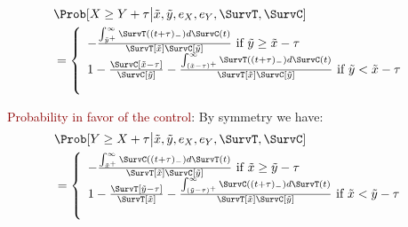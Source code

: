 \documentclass[12pt]{article}
\newcommand\xobs{\tilde{x}}
\newcommand\yobs{\tilde{y}}
\newcommand\censT{e_X}
\newcommand\censC{e_Y}
\begin{document}
\begin{align*}
&\Prob[X \geq Y + \tau \big| \xobs, \yobs, \censT, \censC, \SurvT, \SurvC] \\
&= \left\{ \begin{array}{ll}
           - \frac{
\int_{\yobs^+}^{\infty} \SurvT((t+\tau)_-) d \SurvC(t)
}{
\SurvT[\xobs]\SurvC[\yobs]
}  \text{ if } \yobs \geq \xobs - \tau\\
           1-\frac{\SurvC[\xobs - \tau]}{\SurvC[\yobs]} - \frac{
\int_{(\xobs-\tau)^+}^{\infty} \SurvT((t+\tau)_-) d \SurvC(t)
}{
\SurvT[\xobs]\SurvC[\yobs]
} \text{ if } \yobs < \xobs - \tau\\ \\
           \end{array} \right.
\end{align*}

\noindent \textcolor{darkred}{Probability in favor of the control}:
By symmetry we have: \\
\begin{align*}
&\Prob[Y \geq X + \tau \big| \xobs, \yobs, \censT, \censC, \SurvT, \SurvC] \\
&= \left\{ \begin{array}{ll}
           - \frac{
\int_{\xobs^+}^{\infty} \SurvC((t+\tau)_-) d \SurvT(t)
}{
\SurvT[\xobs]\SurvC[\yobs]
}  \text{ if } \xobs \geq \yobs - \tau\\
           1-\frac{\SurvT[\yobs - \tau]}{\SurvT[\xobs]} - \frac{
\int_{(\yobs-\tau)^+}^{\infty} \SurvC((t+\tau)_-) d \SurvT(t)
}{
\SurvT[\xobs]\SurvC[\yobs]
} \text{ if } \xobs < \yobs - \tau\\ \\
           \end{array} \right.
\end{align*}

\clearpage
\end{document}
